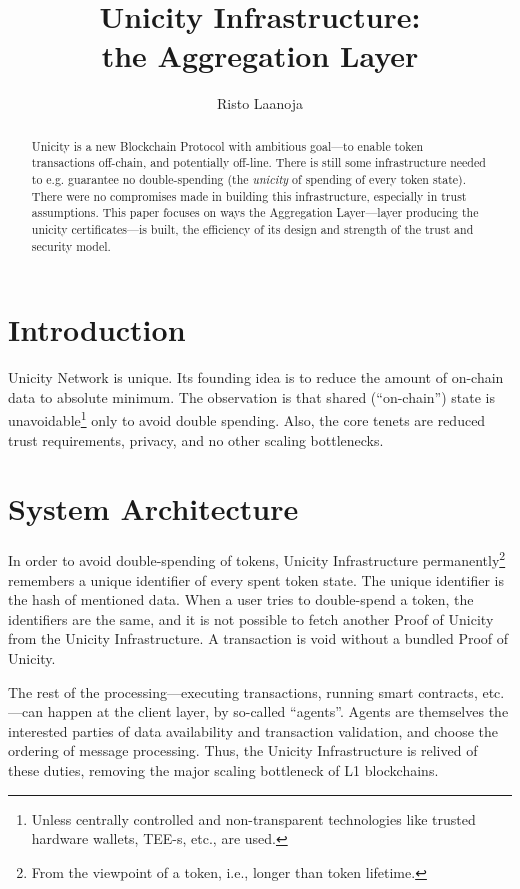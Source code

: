 \documentclass{llncs}
\title{Unicity Infrastructure:\\
    the Aggregation Layer}
\author{
    Risto Laanoja\inst{1}
}
\institute{
    Unicity Labs
}
\begin{document}
\maketitle

\begin{abstract}
Unicity is a new Blockchain Protocol with ambitious goal---to enable token transactions off-chain, and potentially off-line. There is still some infrastructure needed to e.g. guarantee no double-spending (the \textit{unicity} of spending of every token state). There were no compromises made in building this infrastructure, especially in trust assumptions. This paper focuses on ways the Aggregation Layer---layer producing the unicity certificates---is built, the efficiency of its design and strength of the trust and security model.
\end{abstract}


\section{Introduction}

Unicity Network is unique. Its founding idea is to reduce the amount of on-chain data to absolute minimum. The observation is that shared (``on-chain'') state is unavoidable\footnote{Unless centrally controlled and non-transparent technologies like trusted hardware wallets, TEE-s, etc., are used.} only to avoid double spending. Also, the core tenets are reduced trust requirements, privacy, and no other scaling bottlenecks.


\section{System Architecture}

In order to avoid double-spending of tokens, Unicity Infrastructure permanently\footnote{From the viewpoint of a token, i.e., longer than token lifetime.} remembers a unique identifier of every spent token state. The unique identifier is the hash of mentioned data. When a user tries to double-spend a token, the identifiers are the same, and it is not possible to fetch another Proof of Unicity from the Unicity Infrastructure. A transaction is void without a bundled Proof of Unicity.

The rest of the processing---executing transactions, running smart contracts, etc.---can happen at the client layer, by so-called ``agents''. Agents are themselves the interested parties of data availability and transaction validation, and choose the ordering of message processing. Thus, the Unicity Infrastructure is relived of these duties, removing the major scaling bottleneck of L1 blockchains.
\end{document}
